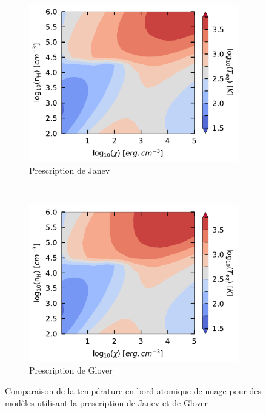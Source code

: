 \begin{appendices}
\vfill
\begin{figure}[!h]
    \centering
    \begin{subfigure}[t]{0.49\textwidth} %
        \centering \includegraphics[trim = {0 0 0 0 },clip,width=1\textwidth]{figure/H2/grid_janev/mapTba.pdf}
        \caption{Prescription de Janev}
    \end{subfigure}
    ~ 
    \begin{subfigure}[t]{0.49\textwidth}
        \centering \includegraphics[trim = {0 0 0 0 },clip,width=1\textwidth]{figure/H2/grid_glover/mapTba.pdf}
        \caption{Prescription de Glover}
    \end{subfigure}
    \caption{Comparaison de la température en bord atomique de nuage pour des modèles utilisant la prescription de Janev et de Glover}
    \label{fig:H2:JanevGlover:Tba}
\end{figure}
\vfill


\end{appendices}
